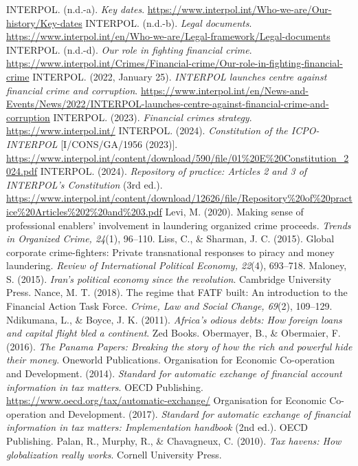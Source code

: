 \begin{referencelist}
   INTERPOL. (n.d.-a). \emph{Key dates}. \url{https://www.interpol.int/Who-we-are/Our-history/Key-dates}
   INTERPOL. (n.d.-b). \emph{Legal documents}. \url{https://www.interpol.int/en/Who-we-are/Legal-framework/Legal-documents}
   INTERPOL. (n.d.-d). \emph{Our role in fighting financial crime}. \url{https://www.interpol.int/Crimes/Financial-crime/Our-role-in-fighting-financial-crime}
   INTERPOL. (2022, January 25). \emph{INTERPOL launches centre against financial crime and corruption}. \url{https://www.interpol.int/en/News-and-Events/News/2022/INTERPOL-launches-centre-against-financial-crime-and-corruption}
   INTERPOL. (2023). \emph{Financial crimes strategy}. \url{https://www.interpol.int/}
   INTERPOL. (2024). \emph{Constitution of the ICPO-INTERPOL} [I/CONS/GA/1956 (2023)]. \url{https://www.interpol.int/content/download/590/file/01\%20E\%20Constitution_2024.pdf}
   INTERPOL. (2024). \emph{Repository of practice: Articles 2 and 3 of INTERPOL's Constitution} (3rd ed.). \url{https://www.interpol.int/content/download/12626/file/Repository\%20of\%20practice\%20Articles\%202\%20and\%203.pdf}
   Levi, M. (2020). Making sense of professional enablers' involvement in laundering organized crime proceeds. \emph{Trends in Organized Crime, 24}(1), 96–110.
   Liss, C., \& Sharman, J. C. (2015). Global corporate crime-fighters: Private transnational responses to piracy and money laundering. \emph{Review of International Political Economy, 22}(4), 693–718.
   Maloney, S. (2015). \emph{Iran's political economy since the revolution}. Cambridge University Press.
   Nance, M. T. (2018). The regime that FATF built: An introduction to the Financial Action Task Force. \emph{Crime, Law and Social Change, 69}(2), 109–129.
   Ndikumana, L., \& Boyce, J. K. (2011). \emph{Africa's odious debts: How foreign loans and capital flight bled a continent}. Zed Books.
   Obermayer, B., \& Obermaier, F. (2016). \emph{The Panama Papers: Breaking the story of how the rich and powerful hide their money}. Oneworld Publications.
   Organisation for Economic Co-operation and Development. (2014). \emph{Standard for automatic exchange of financial account information in tax matters}. OECD Publishing. \url{https://www.oecd.org/tax/automatic-exchange/}
   Organisation for Economic Co-operation and Development. (2017). \emph{Standard for automatic exchange of financial information in tax matters: Implementation handbook} (2nd ed.). OECD Publishing.
   Palan, R., Murphy, R., \& Chavagneux, C. (2010). \emph{Tax havens: How globalization really works}. Cornell University Press.

\end{referencelist}
